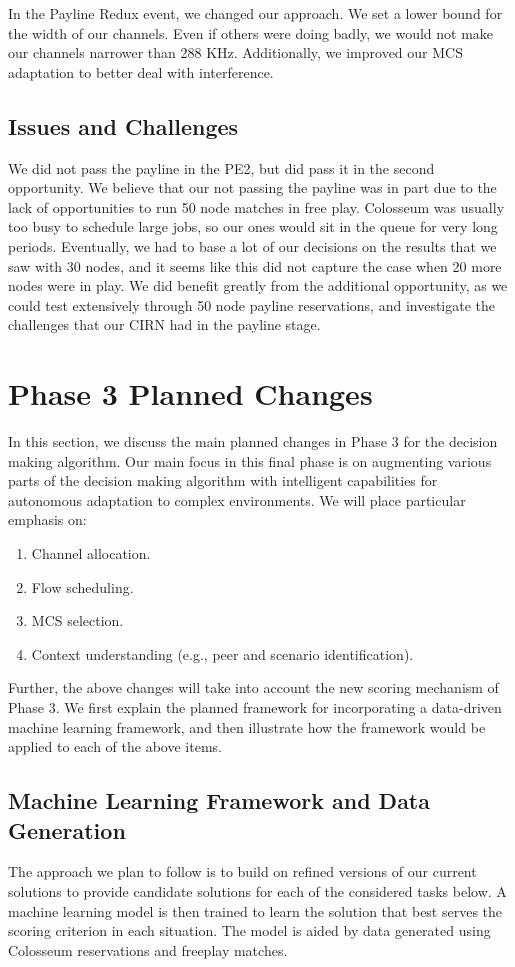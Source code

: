 \documentclass[11pt]{article}
\begin{document}
In the Payline Redux event, we changed our approach. We set a lower bound for the width of our channels. Even if others were doing badly, we would not make our channels narrower than 288 KHz. Additionally, we improved our MCS adaptation to better deal with interference.

\subsection{Issues and Challenges}

We did not pass the payline in the PE2, but did pass it in the second opportunity. We believe that our not passing the payline was in part due to the lack of opportunities to run 50 node matches in free play. Colosseum was usually too busy to schedule large jobs, so our ones would sit in the queue for very long periods. Eventually, we had to base a lot of our decisions on the results that we saw with 30 nodes, and it seems like this did not capture the case when 20 more nodes were in play. We did benefit greatly from the additional opportunity, as we could test extensively through 50 node payline reservations, and investigate the challenges that our CIRN had in the payline stage. 

\section{Phase 3 Planned Changes}
In this section, we discuss the main planned changes in Phase 3 for the decision making algorithm. Our main focus in this final phase is on augmenting various parts of the decision making algorithm with intelligent capabilities for autonomous adaptation to complex environments. We will place particular emphasis on: 
\begin{enumerate}
    \item Channel allocation.
    \item Flow scheduling.
    \item MCS selection.
    \item Context understanding (e.g., peer and scenario identification).
\end{enumerate}
Further, the above changes will take into account the new scoring mechanism of Phase 3. We first explain the planned framework for incorporating a data-driven machine learning framework, and then illustrate how the framework would be applied to each of the above items.   
\subsection{Machine Learning Framework and Data Generation}
The approach we plan to follow is to build on refined versions of our current solutions to provide candidate solutions for each of the considered tasks below. A machine learning model is then trained to learn the solution that best serves the scoring criterion in each situation. The model is aided by data generated using Colosseum reservations and freeplay matches. 
\end{document}
